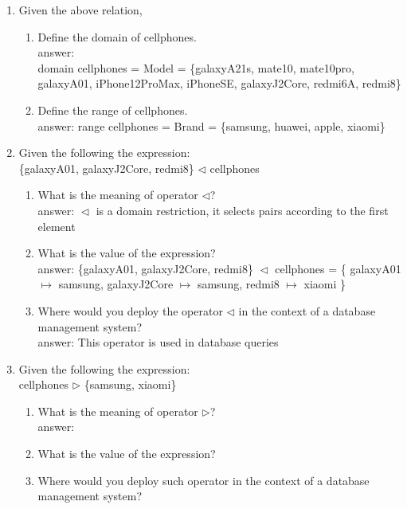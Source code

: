 \documentclass[12pt]{article}
\begin{document}
\begin{enumerate}
	\item Given the above relation,
	\begin{enumerate}
		\item Define the domain of cellphones.\\
		answer: \\
		\indent domain cellphones = Model = \{galaxyA21s, mate10, mate10pro, galaxyA01, iPhone12ProMax, iPhoneSE, galaxyJ2Core, redmi6A, redmi8\}		
		\item Define the range of cellphones.\\
		answer: range cellphones = Brand = \{samsung, huawei, apple, xiaomi\}
	\end{enumerate}

	\item Given the following the expression:\\ \{galaxyA01, galaxyJ2Core, redmi8\} $\lhd$ cellphones
	\begin{enumerate}
		\item What is the meaning of operator $\lhd$? \\
			answer: $\vartriangleleft$ is a domain restriction, it selects pairs according to the first element
		\item What is the value of the expression?	\\
		\indent answer:
		\indent \{galaxyA01, galaxyJ2Core, redmi8\} $\vartriangleleft$ cellphones = \{
		\newline	 galaxyA01 $\mapsto$ samsung,
		\newline	 galaxyJ2Core $\mapsto$ samsung,
		\newline	 redmi8 $\mapsto$ xiaomi	
		\newline \}
		\item Where would you deploy the operator $\lhd$ in the context of a database management system?\\
		answer: This operator is used in database queries
	\end{enumerate}

	\item Given the following the expression:\\ cellphones $\rhd$ \{samsung, xiaomi\}
	\begin{enumerate} 
		\item What is the meaning of operator $\rhd$? \\
		answer: 
		\item What is the value of the expression?	
		\item Where would you deploy such operator in the context of a database management system?
	\end{enumerate}


\end{enumerate}
\end{document}
